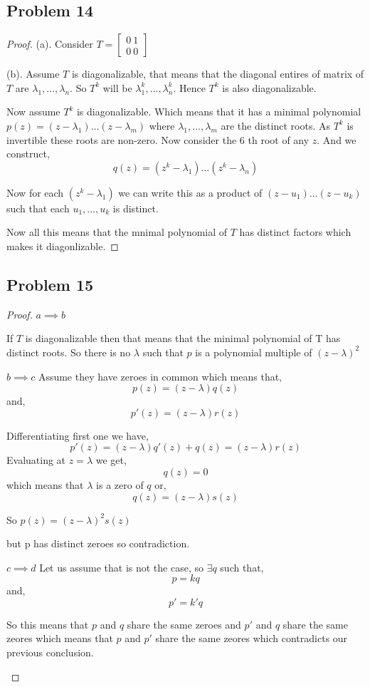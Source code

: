 \documentclass[a4paper]{report}
\begin{document}
\subsection*{Problem 14}
\begin{proof}
   (a). Consider $T = \begin{bmatrix} 0 \ 1 \\ 0 \ 0 \end{bmatrix}$

   (b). Assume $T$ is diagonalizable, that means that the diagonal entires of matrix of $T$ are $\lambda_1,\dots, \lambda_n$. So $T^{k}$ will be $\lambda_1^{k},\dots,\lambda_n^{k}$. Hence $T^{k}$ is also diagonalizable.

   Now assume $T^{k}$ is diagonalizable. Which means that it has a minimal polynomial $p(z) = (z - \lambda_1) \dots  (z - \lambda_m)$ where $\lambda_1,\dots,\lambda_m$ are the distinct roots. As $T^{k}$ is invertible these roots are non-zero. Now consider the $6$ th root of any $z$. And we construct, 
   $$ q(z) = (z^{k} - \lambda_1)\dots(z^{k} - \lambda_n) $$ 

   Now for each $(z^{k} - \lambda_1)$ we can write this as a product of $(z - u_1) \dots (z - u_k)$ such that each $u_1,\dots,u_k$ is distinct. 

   Now all this means that the mnimal polynomial of $T$ has distinct factors which makes it diagonlizable.

\end{proof}
\subsection*{Problem 15}
\begin{proof}
   $a \implies b$ 

   If $T$ is diagonalizable then that means that the minimal polynomial of T has distinct roots. So there is no $\lambda $ such that $p$ is a polynomial multiple of $(z - \lambda)^2$

   $b \implies c$
   Assume they have zeroes in common which means that,  
   $$ p(z) = (z - \lambda)q(z) $$ and, 
   $$ p'(z) = (z - \lambda) r(z) $$ 

   Differentiating first one we have, 
   $$ p'(z) = (z - \lambda)q'(z) + q(z) = (z - \lambda) r(z) $$ 
   Evaluating at $z = \lambda $ we get, 
   $$ q(z) = 0 $$  which means that $\lambda $ is a zero of $q$ or, 
   $$ q(z) = (z - \lambda)s(z) $$ 

   So $p(z) = (z - \lambda)^2 s(z)$ 

   but p has distinct zeroes so contradiction.

   $c \implies d$ 
   Let us assume that is not the case, so $\exists q$ such that, 
   $$ p = kq $$  and, 
   $$ p' = k'q $$ 

   So this means that $p$ and $q$ share the same zeroes and $p'$ and $q$ share the same zeores which means that $p$ and $p'$ share the same zeores which contradicts our previous conclusion.
   
   $$  $$ 
\end{proof}
\end{document}
